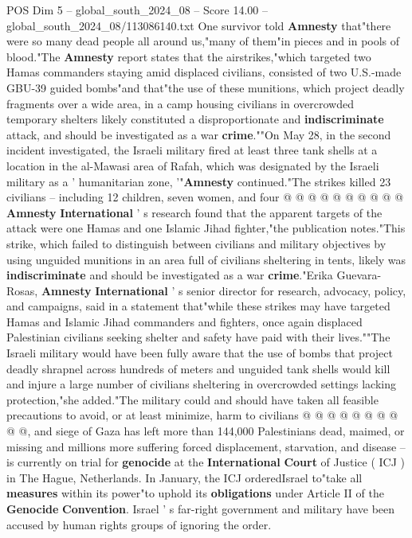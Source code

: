 \begin{textsample}{POS Dim 5 – global\_south\_2024\_08 – Score 14.00 – global\_south\_2024\_08/113086140.txt}
One survivor told \textbf{Amnesty} that"there were so many dead people all around us,"many of them"in pieces and in pools of blood."The \textbf{Amnesty} report states that the airstrikes,"which targeted two Hamas commanders staying amid displaced civilians, consisted of two U.S.-made GBU-39 guided bombs"and that"the use of these munitions, which project deadly fragments over a wide area, in a camp housing civilians in overcrowded temporary shelters likely constituted a disproportionate and \textbf{indiscriminate} attack, and should be investigated as a war \textbf{crime}.""On May 28, in the second incident investigated, the Israeli military fired at least three tank shells at a location in the al-Mawasi area of Rafah, which was designated by the Israeli military as a ' humanitarian zone, '"\textbf{Amnesty} continued."The strikes killed 23 civilians -- including 12 children, seven women, and four @ @ @ @ @ @ @ @ @ @ \textbf{Amnesty} \textbf{International} ' s research found that the apparent targets of the attack were one Hamas and one Islamic Jihad fighter,"the publication notes."This strike, which failed to distinguish between civilians and military objectives by using unguided munitions in an area full of civilians sheltering in tents, likely was \textbf{indiscriminate} and should be investigated as a war \textbf{crime}."Erika Guevara-Rosas, \textbf{Amnesty} \textbf{International} ' s senior director for research, advocacy, policy, and campaigns, said in a statement that"while these strikes may have targeted Hamas and Islamic Jihad commanders and fighters, once again displaced Palestinian civilians seeking shelter and safety have paid with their lives.""The Israeli military would have been fully aware that the use of bombs that project deadly shrapnel across hundreds of meters and unguided tank shells would kill and injure a large number of civilians sheltering in overcrowded settings lacking protection,"she added."The military could and should have taken all feasible precautions to avoid, or at least minimize, harm to civilians @ @ @ @ @ @ @ @ @ @, and siege of Gaza has left more than 144,000 Palestinians dead, maimed, or missing and millions more suffering forced displacement, starvation, and disease -- is currently on trial for \textbf{genocide} at the \textbf{International} \textbf{Court} of Justice ( ICJ ) in The Hague, Netherlands.
In January, the ICJ orderedIsrael to"take all \textbf{measures} within its power"to uphold its \textbf{obligations} under Article II of the \textbf{Genocide} \textbf{Convention}.
Israel ' s far-right government and military have been accused by human rights groups of ignoring the order.

\end{textsample}
